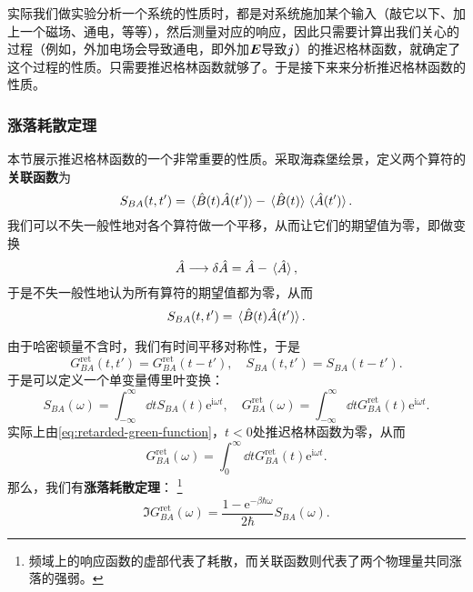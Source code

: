 \documentclass[hyperref, UTF8, a4paper]{ctexart}
\newcommand*{\ii}{\mathrm{i}}
\newcommand*{\ee}{\mathrm{e}}
\begin{document}
实际我们做实验分析一个系统的性质时，都是对系统施加某个输入（敲它以下、加上一个磁场、通电，等等），然后测量对应的响应，因此只需要计算出我们关心的过程（例如，外加电场会导致通电，即外加$\vb*{E}$导致$\vb*{j}$）的推迟格林函数，就确定了这个过程的性质。只需要推迟格林函数就够了。于是接下来来分析推迟格林函数的性质。

\subsubsection{涨落耗散定理}

本节展示推迟格林函数的一个非常重要的性质。采取海森堡绘景，定义两个算符的\textbf{关联函数}为
\begin{equation}
    S_{BA}(t,t') = \expval*{\hat{B}(t)\hat{A}(t')} - \expval*{\hat{B}(t)}\expval*{\hat{A}(t')}.
\end{equation}
我们可以不失一般性地对各个算符做一个平移，从而让它们的期望值为零，即做变换
\[
    \hat{A} \longrightarrow \var{\hat{A}} = \hat{A} - \expval*{\hat{A}},
\]
于是不失一般性地认为所有算符的期望值都为零，从而
\begin{equation}
    S_{BA}(t,t') = \expval*{\hat{B}(t)\hat{A}(t')}.
\end{equation}

由于哈密顿量不含时，我们有时间平移对称性，于是
\begin{equation}
    G_{BA}^\text{ret}(t,t') = G_{BA}^\text{ret}(t-t'), \quad S_{BA}(t,t') = S_{BA}(t-t').
\end{equation}
于是可以定义一个单变量傅里叶变换：
\begin{equation}
    S_{BA}(\omega) = \int_{-\infty}^\infty \dd{t} S_{BA}(t) \ee^{\ii \omega t}, \quad G_{BA}^\text{ret}(\omega) = \int_{-\infty}^\infty \dd{t} G_{BA}^\text{ret}(t) \ee^{\ii \omega t}.
\end{equation}
实际上由\eqref{eq:retarded-green-function}，$t<0$处推迟格林函数为零，从而
\[
    G_{BA}^\text{ret}(\omega) = \int_0^\infty \dd{t} G_{BA}^\text{ret}(t) \ee^{\ii \omega t}.
\]
那么，我们有\textbf{涨落耗散定理}：%
\footnote{频域上的响应函数的虚部代表了耗散，而关联函数则代表了两个物理量共同涨落的强弱。}
\begin{equation}
    \Im G_{BA}^\text{ret}(\omega) = \frac{1 - \ee^{-\beta\hbar\omega}}{2\hbar} S_{BA}(\omega).
\end{equation}
\end{document}
